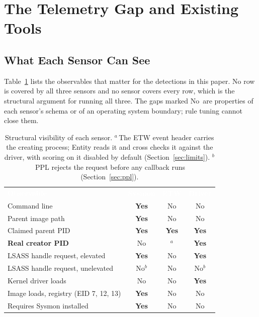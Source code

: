 \documentclass[10pt,twocolumn,letterpaper]{article}
\newcommand{\Thd}[1]{\textcolor{white}{\sffamily\bfseries #1}}
\newcommand{\Y}{\textcolor{YesGreen}{\textbf{Yes}}}
\newcommand{\N}{\textcolor{NoRed}{No}}
\newcommand{\headrow}{\rowcolor{TableHead}}
\begin{document}
\section{The Telemetry Gap and Existing Tools}
\label{sec:gap}

\subsection{What Each Sensor Can See}

Table~\ref{tbl:sensors} lists the observables that matter for the detections in this
paper. No row is covered by all three sensors and no sensor covers every row, which is
the structural argument for running all three. The gaps marked \N\ are properties of
each sensor's schema or of an operating system boundary; rule tuning cannot close them.

\begin{table}[t]
\centering
\caption{Structural visibility of each sensor. $^{a}$\,The ETW event header carries the
creating process; Entity reads it and cross checks it against the driver, with scoring on
it disabled by default (Section~\ref{sec:limits}). $^{b}$\,PPL rejects the request before
any callback runs (Section~\ref{sec:ppl}).}
\label{tbl:sensors}
\small
\renewcommand{\arraystretch}{1.12}
\begin{tabularx}{\columnwidth}{@{}>{\raggedright\arraybackslash}Xccc@{}}
\headrow \Thd{Observable} & \Thd{Sysmon} & \Thd{ETW} & \Thd{Driver} \\
Command line                           & \Y & \N & \N \\
Parent image path                      & \Y & \N & \N \\
Claimed parent PID                     & \Y & \Y & \Y \\
\textbf{Real creator PID}              & \N & $^{a}$ & \Y \\
LSASS handle request, elevated         & \Y & \N & \Y \\
LSASS handle request, unelevated       & \N$^{b}$ & \N & \N$^{b}$ \\
Kernel driver loads                    & \N & \N & \Y \\
Image loads, registry (EID 7, 12, 13)  & \Y & \N & \N \\
Requires Sysmon installed              & \Y & \N & \N \\
\bottomrule
\end{tabularx}
\end{table}
\end{document}

